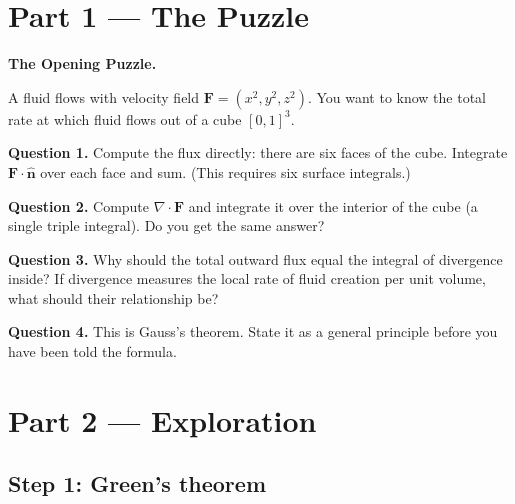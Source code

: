 \documentclass[12pt,a4paper]{article}
\begin{document}
\newpage

\section{Part 1 \texorpdfstring{---}{--} The Puzzle}

\begin{puzzlebox}
\textbf{The Opening Puzzle.}

A fluid flows with velocity field $\mathbf{F}=(x^2, y^2, z^2)$. You want to know the total rate at which fluid flows out of a cube $[0,1]^3$.

\medskip
\textbf{Question 1.} Compute the flux directly: there are six faces of the cube. Integrate $\mathbf{F}\cdot\hat{\mathbf{n}}$ over each face and sum. (This requires six surface integrals.)

\textbf{Question 2.} Compute $\nabla\cdot\mathbf{F}$ and integrate it over the interior of the cube (a single triple integral). Do you get the same answer?

\textbf{Question 3.} Why should the total outward flux equal the integral of divergence inside? If divergence measures the local rate of fluid creation per unit volume, what should their relationship be?

\textbf{Question 4.} This is Gauss's theorem. State it as a general principle before you have been told the formula.
\end{puzzlebox}

\section{Part 2 \texorpdfstring{---}{--} Exploration}

\subsection{Step 1: Green's theorem}
\end{document}
